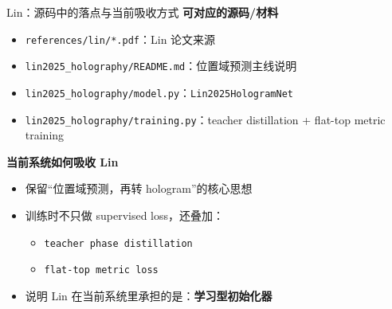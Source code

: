 \documentclass[aspectratio=169,10pt]{ctexbeamer}
\begin{document}
\begin{frame}{Lin：源码中的落点与当前吸收方式}
  \textbf{可对应的源码/材料}
  \begin{itemize}
    \item \texttt{references/lin/*.pdf}：Lin 论文来源
    \item \texttt{lin2025\_holography/README.md}：位置域预测主线说明
    \item \texttt{lin2025\_holography/model.py}：\texttt{Lin2025HologramNet}
    \item \texttt{lin2025\_holography/training.py}：teacher distillation + flat-top metric training
  \end{itemize}

  \textbf{当前系统如何吸收 Lin}
  \begin{itemize}
    \item 保留“位置域预测，再转 hologram”的核心思想
    \item 训练时不只做 supervised loss，还叠加：
    \begin{itemize}
      \item \texttt{teacher phase distillation}
      \item \texttt{flat-top metric loss}
    \end{itemize}
    \item 说明 Lin 在当前系统里承担的是：\textbf{学习型初始化器}
  \end{itemize}
\end{frame}
\end{document}

